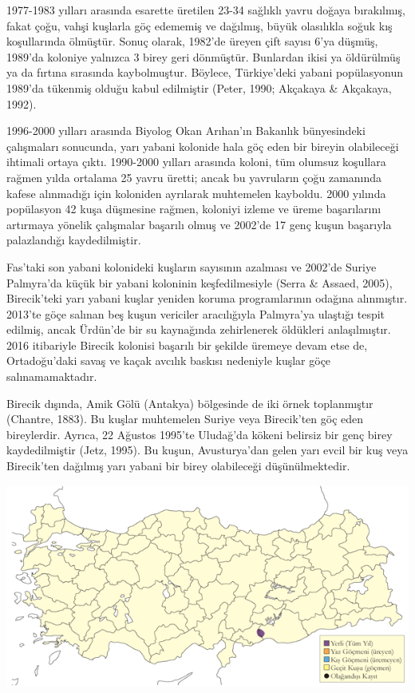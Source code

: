 \documentclass[
  a4paper,
  DIV=11,
  numbers=noendperiod]{scrreprt}
\begin{document}
1977-1983 yılları arasında esarette üretilen 23-34 sağlıklı yavru doğaya
bırakılmış, fakat çoğu, vahşi kuşlarla göç edememiş ve dağılmış, büyük
olasılıkla soğuk kış koşullarında ölmüştür. Sonuç olarak, 1982'de üreyen
çift sayısı 6'ya düşmüş, 1989'da koloniye yalnızca 3 birey geri
dönmüştür. Bunlardan ikisi ya öldürülmüş ya da fırtına sırasında
kaybolmuştur. Böylece, Türkiye'deki yabani popülasyonun 1989'da tükenmiş
olduğu kabul edilmiştir (Peter, 1990; Akçakaya \& Akçakaya, 1992).

1996-2000 yılları arasında Biyolog Okan Arıhan'ın Bakanlık bünyesindeki
çalışmaları sonucunda, yarı yabani kolonide hala göç eden bir bireyin
olabileceği ihtimali ortaya çıktı. 1990-2000 yılları arasında koloni,
tüm olumsuz koşullara rağmen yılda ortalama 25 yavru üretti; ancak bu
yavruların çoğu zamanında kafese alınmadığı için koloniden ayrılarak
muhtemelen kayboldu. 2000 yılında popülasyon 42 kuşa düşmesine rağmen,
koloniyi izleme ve üreme başarılarını artırmaya yönelik çalışmalar
başarılı olmuş ve 2002'de 17 genç kuşun başarıyla palazlandığı
kaydedilmiştir.

Fas'taki son yabani kolonideki kuşların sayısının azalması ve 2002'de
Suriye Palmyra'da küçük bir yabani koloninin keşfedilmesiyle (Serra \&
Assaed, 2005), Birecik'teki yarı yabani kuşlar yeniden koruma
programlarının odağına alınmıştır. 2013'te göçe salınan beş kuşun
vericiler aracılığıyla Palmyra'ya ulaştığı tespit edilmiş, ancak
Ürdün'de bir su kaynağında zehirlenerek öldükleri anlaşılmıştır. 2016
itibariyle Birecik kolonisi başarılı bir şekilde üremeye devam etse de,
Ortadoğu'daki savaş ve kaçak avcılık baskısı nedeniyle kuşlar göçe
salınamamaktadır.

Birecik dışında, Amik Gölü (Antakya) bölgesinde de iki örnek
toplanmıştır (Chantre, 1883). Bu kuşlar muhtemelen Suriye veya
Birecik'ten göç eden bireylerdir. Ayrıca, 22 Ağustos 1995'te Uludağ'da
kökeni belirsiz bir genç birey kaydedilmiştir (Jetz, 1995). Bu kuşun,
Avusturya'dan gelen yarı evcil bir kuş veya Birecik'ten dağılmış yarı
yabani bir birey olabileceği düşünülmektedir.

\includegraphics{images/harita_Page_061.png}
\end{document}
